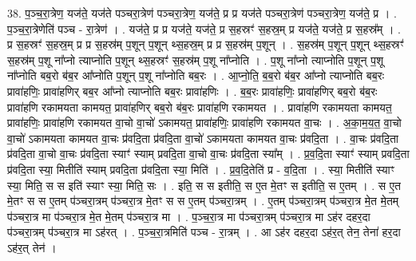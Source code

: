 \documentclass[17pt]{extarticle}
\begin{document}
38. प॒ञ्च॒रा॒त्रेण॒ यज॑ते॒ यज॑ते पञ्चरा॒त्रेण॑ पञ्चरा॒त्रेण॒ यज॑ते॒ प्र प्र यज॑ते पञ्चरा॒त्रेण॑ पञ्चरा॒त्रेण॒ यज॑ते॒ प्र । . प॒ञ्च॒रा॒त्रेणेति॑ पञ्च - रा॒त्रेण॑ । . यज॑ते॒ प्र प्र यज॑ते॒ यज॑ते॒ प्र स॒हस्रꣳ॑ स॒हस्र॒म् प्र यज॑ते॒ यज॑ते॒ प्र स॒हस्र᳚म् । . प्र स॒हस्रꣳ॑ स॒हस्र॒म् प्र प्र स॒हस्र॑म् प॒शून् प॒शून् थ्स॒हस्र॒म् प्र प्र स॒हस्र॑म् प॒शून् । . स॒हस्र॑म् प॒शून् प॒शून् थ्स॒हस्रꣳ॑ स॒हस्र॑म् प॒शू ना᳚प्नो त्याप्नोति प॒शून् थ्स॒हस्रꣳ॑ स॒हस्र॑म् प॒शू ना᳚प्नोति । . प॒शू ना᳚प्नो त्याप्नोति प॒शून् प॒शू ना᳚प्नोति बब॒रो ब॑ब॒र आ᳚प्नोति प॒शून् प॒शू ना᳚प्नोति बब॒रः । . आ॒प्नो॒ति॒ ब॒ब॒रो ब॑ब॒र आ᳚प्नो त्याप्नोति बब॒रः प्रावा॑हणिः॒ प्रावा॑हणिर् बब॒र आ᳚प्नो त्याप्नोति बब॒रः प्रावा॑हणिः । . ब॒ब॒रः प्रावा॑हणिः॒ प्रावा॑हणिर् बब॒रो ब॑ब॒रः प्रावा॑हणि रकामयता कामयत॒ प्रावा॑हणिर् बब॒रो ब॑ब॒रः प्रावा॑हणि रकामयत । . प्रावा॑हणि रकामयता कामयत॒ प्रावा॑हणिः॒ प्रावा॑हणि रकामयत वा॒चो वा॒चो॑ ऽकामयत॒ प्रावा॑हणिः॒ प्रावा॑हणि रकामयत वा॒चः । . अ॒का॒म॒य॒त॒ वा॒चो वा॒चो॑ ऽकामयता कामयत वा॒चः प्र॑वदि॒ता प्र॑वदि॒ता वा॒चो॑ ऽकामयता कामयत वा॒चः प्र॑वदि॒ता । . वा॒चः प्र॑वदि॒ता प्र॑वदि॒ता वा॒चो वा॒चः प्र॑वदि॒ता स्याꣳ॑ स्याम् प्रवदि॒ता वा॒चो वा॒चः प्र॑वदि॒ता स्या᳚म् । . प्र॒व॒दि॒ता स्याꣳ॑ स्याम् प्रवदि॒ता प्र॑वदि॒ता स्या॒ मितीति॑ स्याम् प्रवदि॒ता प्र॑वदि॒ता स्या॒ मिति॑ । . प्र॒व॒दि॒तेति॑ प्र - व॒दि॒ता । . स्या॒ मितीति॑ स्याꣳ स्या॒ मिति॒ स स इति॑ स्याꣳ स्या॒ मिति॒ सः । . इति॒ स स इतीति॒ स ए॒त मे॒तꣳ स इतीति॒ स ए॒तम् । . स ए॒त मे॒तꣳ स स ए॒तम् प॑ञ्चरा॒त्रम् प॑ञ्चरा॒त्र मे॒तꣳ स स ए॒तम् प॑ञ्चरा॒त्रम् । . ए॒तम् प॑ञ्चरा॒त्रम् प॑ञ्चरा॒त्र मे॒त मे॒तम् प॑ञ्चरा॒त्र मा प॑ञ्चरा॒त्र मे॒त मे॒तम् प॑ञ्चरा॒त्र मा । . प॒ञ्च॒रा॒त्र मा प॑ञ्चरा॒त्रम् प॑ञ्चरा॒त्र मा ऽह॑र दहर॒दा प॑ञ्चरा॒त्रम् प॑ञ्चरा॒त्र मा ऽह॑रत् । . प॒ञ्च॒रा॒त्रमिति॑ पञ्च - रा॒त्रम् । . आ ऽह॑र दहर॒दा ऽह॑र॒त् तेन॒ तेना॑ हर॒दा ऽह॑र॒त् तेन॑ । \newline
\pagebreak
{}
\end{document}
